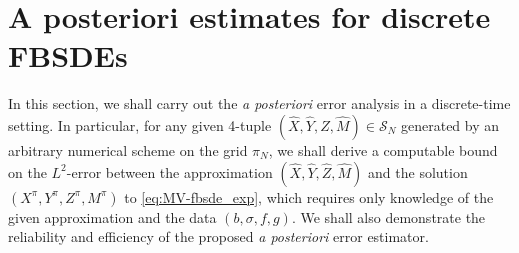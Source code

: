 \documentclass[11pt]{article}
\numberwithin{equation}{section}
\theoremstyle{definition}
\theoremstyle{remark}
\newtheorem{Remark}{Remark}[section]
\def\l{\label}  \def\f{\frac}  \def\fa{\forall}
\def\cF{\mathcal{F}}
\def\cS{\mathcal{S}}
\def\sF{{\mathbb{F}}}
\newcommand{\fbsde}{FBS$\Delta$E }
\begin{document}
%
%


\section{A posteriori  estimates for  discrete FBSDEs}\l{sec:a_posteriori_discrete}

In this section,
we shall carry out the \textit{a posteriori} error analysis 
in a discrete-time setting.
In particular, 
for any  given 
4-tuple 
$(\hat{X},\hat{Y},\hat{Z}, \hat{M})\in\cS_N$
generated by an arbitrary numerical scheme on the grid $\pi_N$,
we shall derive  a computable  bound on the $L^2$-error between the approximation $(\hat{X},\hat{Y},\hat{Z}, \hat{M})$ 
 and the solution $(X^\pi,Y^\pi, Z^\pi, M^\pi)$ to \eqref{eq:MV-fbsde_exp}, 
 which requires only
knowledge of the given approximation and the data $(b, \sigma, f, g)$.
We shall also demonstrate the  reliability and efficiency of
the proposed \textit{a posteriori} error estimator.
\end{document}

